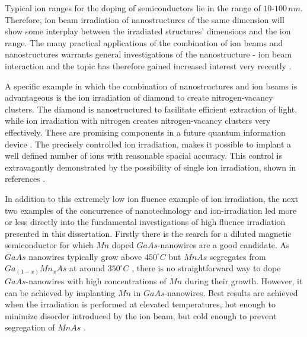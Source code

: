 

Typical ion ranges for the doping of semiconductors lie in the range of $10$-$100\,nm$. Therefore, ion beam irradiation of nanostructures of the same dimension will show some interplay between the irradiated structures' dimensions and the ion range. The many practical applications of the combination of ion beams and nanostructures warrants general investigations of the nanostructure - ion beam interaction and the topic has therefore gained increased interest very recently \cite{borschel_ion-solid_2012,greaves_enhanced_2013,nietiadi_sputtering_2014,johannes_ion_2015,urbassek_sputter_2015}.  

A specific example in which the combination of nanostructures and ion beams is advantageous is the ion irradiation of diamond to create nitrogen-vacancy clusters. The diamond is nanostructured to facilitate efficient extraction of light, while ion irradiation with nitrogen creates nitrogen-vacancy clusters very effectively. These are promising components in a future quantum information device \cite{babinec_diamond_2010}. The precisely controlled ion irradiation, makes it possible to implant a well defined number of ions with reasonable spacial accuracy. This control is extravagantly demonstrated by the possibility of single ion irradiation, shown in references \cite{meijer_concept_2006,ohdomari_single-ion_2008}. 

In addition to this extremely low ion fluence example of ion irradiation, the next two examples of the concurrence of nanotechnology and ion-irradiation led more or less directly into the fundamental investigations of high fluence irradiation presented in this dissertation. Firstly there is the search for a diluted magnetic semiconductor for which $Mn$ doped $GaAs$-nanowires are a good candidate. As $GaAs$ nanowires typically grow above $450^\circ C$ but $MnAs$ segregates from $Ga_{(1-x)}Mn_xAs$ at around $350^\circ C$ \cite{dietl_engineering_2006,sadowski_gaasmnas_2011}, there is no straightforward way to dope $GaAs$-nanowires with high concentrations of $Mn$ during their growth. However, it can be achieved by implanting $Mn$ in $GaAs$-nanowires. Best results are achieved when the irradiation is performed at elevated temperatures, hot enough to minimize disorder introduced by the ion beam, but cold enough to prevent segregation of $MnAs$ \cite{borschel_new_2011,paschoal_hopping_2012,borschel_ion-solid_2012,kumar_magnetic_2013,paschoal_magnetoresistance_2014}. 

